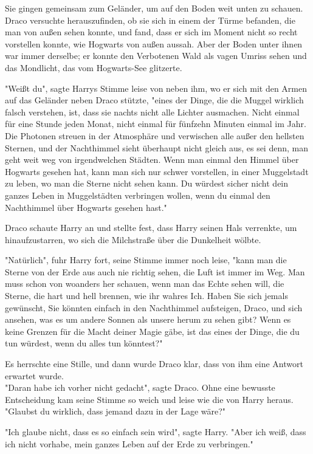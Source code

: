 {Sie gingen gemeinsam zum Geländer, um auf den Boden weit unten zu schauen. Draco versuchte herauszufinden, ob sie sich in einem der Türme befanden, die man von außen sehen konnte, und fand, dass er sich im Moment nicht so recht vorstellen konnte, wie Hogwarts von außen aussah. Aber der Boden unter ihnen war immer derselbe; er konnte den Verbotenen Wald als vagen Umriss sehen und das Mondlicht, das vom Hogwarts-See glitzerte.

"Weißt du", sagte Harrys Stimme leise von neben ihm, wo er sich mit den Armen auf das Geländer neben Draco stützte, "eines der Dinge, die die Muggel wirklich falsch verstehen, ist, dass sie nachts nicht alle Lichter ausmachen. Nicht einmal für eine Stunde jeden Monat, nicht einmal für fünfzehn Minuten einmal im Jahr. Die Photonen streuen in der Atmosphäre und verwischen alle außer den hellsten Sternen, und der Nachthimmel sieht überhaupt nicht gleich aus, es sei denn, man geht weit weg von irgendwelchen Städten. Wenn man einmal den Himmel über Hogwarts gesehen hat, kann man sich nur schwer vorstellen, in einer Muggelstadt\\ zu leben, wo man die Sterne nicht sehen kann. Du würdest sicher nicht dein ganzes Leben in Muggelstädten verbringen wollen, wenn du einmal den Nachthimmel über Hogwarts gesehen hast."

Draco schaute Harry an und stellte fest, dass Harry seinen Hals verrenkte, um hinaufzustarren, wo sich die Milchstraße über die Dunkelheit wölbte.

"Natürlich", fuhr Harry fort, seine Stimme immer noch leise, "kann man die Sterne von der Erde aus auch nie richtig sehen, die Luft ist immer im Weg. Man muss schon von woanders her schauen, wenn man das Echte sehen will, die Sterne, die hart und hell brennen, wie ihr wahres Ich. Haben Sie sich jemals gewünscht, Sie könnten einfach in den Nachthimmel aufsteigen, Draco, und sich ansehen, was es um andere Sonnen als unsere herum zu sehen gibt? Wenn es keine Grenzen für die Macht deiner Magie gäbe, ist das eines der Dinge, die du tun würdest, wenn du alles tun könntest?"

Es herrschte eine Stille, und dann wurde Draco klar, dass von ihm eine Antwort erwartet wurde.\\ "Daran habe ich vorher nicht gedacht", sagte Draco. Ohne eine bewusste Entscheidung kam seine Stimme so weich und leise wie die von Harry heraus. "Glaubst du wirklich, dass jemand dazu in der Lage wäre?"

"Ich glaube nicht, dass es so einfach sein wird", sagte Harry. "Aber ich weiß, dass ich nicht vorhabe, mein ganzes Leben auf der Erde zu verbringen."

}

